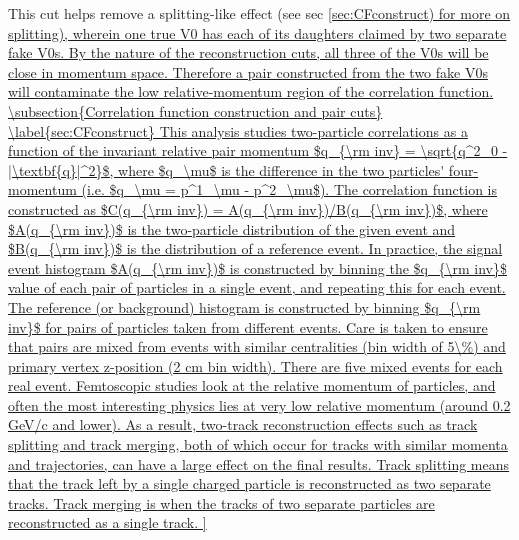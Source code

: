 This cut helps remove a splitting-like effect (see sec \ref{sec:CFconstruct) for more on splitting), wherein one true V0 has each of its daughters claimed by two separate fake V0s.  By the nature of the reconstruction cuts, all three of the V0s will be close in momentum space.  Therefore a pair constructed from the two fake V0s will contaminate the low relative-momentum region of the correlation function.  


\subsection{Correlation function construction and pair cuts}
\label{sec:CFconstruct}

This analysis studies two-particle correlations as a function of the invariant relative pair momentum $q_{\rm inv} = \sqrt{q^2_0 - |\textbf{q}|^2}$, where $q_\mu$ is the difference in the two particles' four-momentum (i.e. $q_\mu = p^1_\mu - p^2_\mu$).  The correlation function is constructed as $C(q_{\rm inv}) = A(q_{\rm inv})/B(q_{\rm inv})$, where $A(q_{\rm inv})$ is the two-particle distribution of the given event and $B(q_{\rm inv})$ is the distribution of a reference event.  In practice, the signal event histogram $A(q_{\rm inv})$ is constructed by binning the $q_{\rm inv}$ value of each pair of particles in a single event, and repeating this for each event.  The reference (or background) histogram is constructed by binning $q_{\rm inv}$ for pairs of particles taken from different events.  Care is taken to ensure that pairs are mixed from events with similar centralities (bin width of 5\%) and primary vertex z-position (2 cm bin width).  There are five mixed events for each real event.

Femtoscopic studies look at the relative momentum of particles, and often the most interesting physics lies at very low relative momentum (around 0.2 GeV/c and lower).  As a result, two-track reconstruction effects such as track splitting and track merging, both of which occur for tracks with similar momenta and trajectories, can have a large effect on the final results.  Track splitting means that the track left by a single charged particle is reconstructed as two separate tracks. Track merging is when the tracks of two separate particles are reconstructed as a single track.  

}
